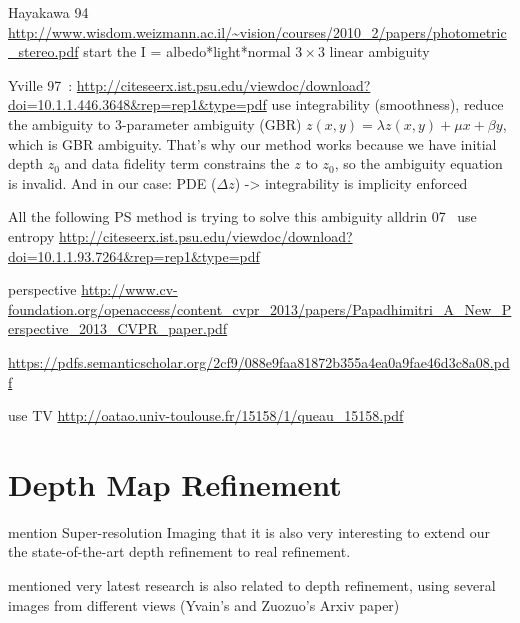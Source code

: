 Hayakawa 94~\cite{hayakawa1994photometric} \url{http://www.wisdom.weizmann.ac.il/~vision/courses/2010_2/papers/photometric_stereo.pdf}
start the I = albedo*light*normal $3\times3$ linear ambiguity

Yville 97~\cite{yuille1997shape}: \url{http://citeseerx.ist.psu.edu/viewdoc/download?doi=10.1.1.446.3648&rep=rep1&type=pdf}
use integrability (smoothness), reduce the ambiguity to 3-parameter ambiguity (GBR)
$z(x,y) = \lambda z(x,y) + \mu x + \beta y$, which is GBR ambiguity. That's why our method works because we have initial depth $z_0$ and data fidelity term constrains the $z$ to $z_0$, so the ambiguity equation is invalid. 
And in our case: PDE ($\Delta z$) -> integrability is implicity enforced

All the following PS method is trying to solve this ambiguity
alldrin 07~\cite{alldrin2007resolving} use entropy \url{http://citeseerx.ist.psu.edu/viewdoc/download?doi=10.1.1.93.7264&rep=rep1&type=pdf}

\cite{papadhimitri2013new} perspective \url{http://www.cv-foundation.org/openaccess/content_cvpr_2013/papers/Papadhimitri_A_New_Perspective_2013_CVPR_paper.pdf}

\cite{papadhimitri2014closed}\url{https://pdfs.semanticscholar.org/2cf9/088e9faa81872b355a4ea0a9fae46d3c8a08.pdf}

\cite{queau2015solving} use TV \url{http://oatao.univ-toulouse.fr/15158/1/queau_15158.pdf}



\section{Depth Map Refinement}
mention Super-resolution Imaging that it is also very interesting to extend our the state-of-the-art depth refinement to real refinement.

mentioned very latest research is also related to depth refinement, using several images from different views (Yvain's and Zuozuo's Arxiv paper) 

%
%

